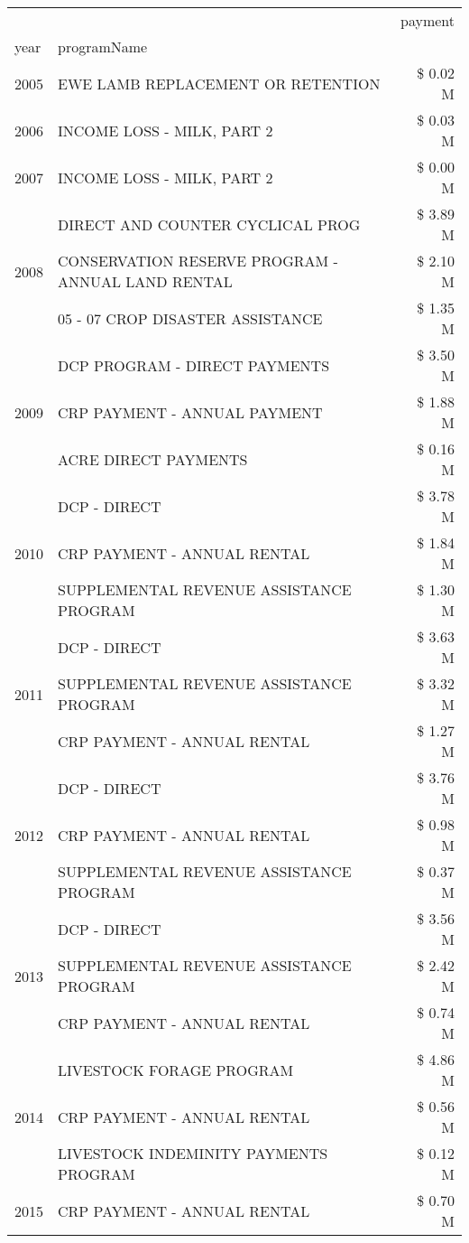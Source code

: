 \begin{tabular}{llr}
\toprule
 &  & payment \\
year & programName &  \\
\midrule
2005 & EWE LAMB REPLACEMENT OR RETENTION & \$ 0.02 M \\
\cline{1-3}
2006 & INCOME LOSS - MILK, PART 2 & \$ 0.03 M \\
\cline{1-3}
2007 & INCOME LOSS - MILK, PART 2 & \$ 0.00 M \\
\cline{1-3}
\multirow[t]{3}{*}{2008} & DIRECT AND COUNTER CYCLICAL PROG & \$ 3.89 M \\
 & CONSERVATION RESERVE PROGRAM - ANNUAL LAND RENTAL & \$ 2.10 M \\
 & 05 - 07 CROP DISASTER ASSISTANCE & \$ 1.35 M \\
\cline{1-3}
\multirow[t]{3}{*}{2009} & DCP PROGRAM - DIRECT PAYMENTS & \$ 3.50 M \\
 & CRP PAYMENT - ANNUAL PAYMENT & \$ 1.88 M \\
 & ACRE DIRECT PAYMENTS & \$ 0.16 M \\
\cline{1-3}
\multirow[t]{3}{*}{2010} & DCP - DIRECT & \$ 3.78 M \\
 & CRP PAYMENT - ANNUAL RENTAL & \$ 1.84 M \\
 & SUPPLEMENTAL REVENUE ASSISTANCE PROGRAM & \$ 1.30 M \\
\cline{1-3}
\multirow[t]{3}{*}{2011} & DCP - DIRECT & \$ 3.63 M \\
 & SUPPLEMENTAL REVENUE ASSISTANCE PROGRAM & \$ 3.32 M \\
 & CRP PAYMENT - ANNUAL RENTAL & \$ 1.27 M \\
\cline{1-3}
\multirow[t]{3}{*}{2012} & DCP - DIRECT & \$ 3.76 M \\
 & CRP PAYMENT - ANNUAL RENTAL & \$ 0.98 M \\
 & SUPPLEMENTAL REVENUE ASSISTANCE PROGRAM & \$ 0.37 M \\
\cline{1-3}
\multirow[t]{3}{*}{2013} & DCP - DIRECT & \$ 3.56 M \\
 & SUPPLEMENTAL REVENUE ASSISTANCE PROGRAM & \$ 2.42 M \\
 & CRP PAYMENT - ANNUAL RENTAL & \$ 0.74 M \\
\cline{1-3}
\multirow[t]{3}{*}{2014} & LIVESTOCK FORAGE PROGRAM & \$ 4.86 M \\
 & CRP PAYMENT - ANNUAL RENTAL & \$ 0.56 M \\
 & LIVESTOCK INDEMINITY PAYMENTS PROGRAM & \$ 0.12 M \\
\cline{1-3}
\multirow[t]{3}{*}{2015} & CRP PAYMENT - ANNUAL RENTAL & \$ 0.70 M \\

\end{tabular}

